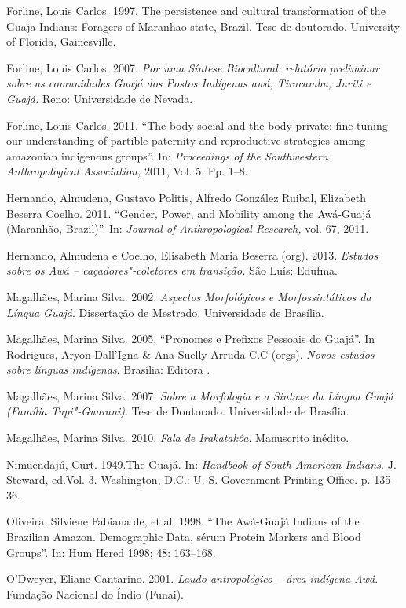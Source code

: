 Forline, Louis Carlos. 1997. The persistence and cultural transformation
of the Guaja Indians: Foragers of Maranhao state, Brazil. Tese de
doutorado. University of Florida, Gainesville.

Forline, Louis Carlos. 2007. \emph{Por uma Síntese Biocultural:
relatório preliminar sobre as comunidades Guajá dos Postos Indígenas
awá, Tiracambu, Juriti e Guajá.} Reno: Universidade de Nevada.

Forline, Louis Carlos. 2011. ``The body social and the body private: fine
tuning our understanding of partible paternity and reproductive
strategies among amazonian indigenous groups''. In: \emph{Proceedings of
the Southwestern Anthropological Association,} 2011, Vol. 5, Pp. 1--8.

Hernando, Almudena, Gustavo Politis, Alfredo González Ruibal, Elizabeth
Beserra Coelho. 2011. ``Gender, Power, and Mobility among the Awá-Guajá
(Maranhão, Brazil)''. In: \emph{Journal of Anthropological Research,}
vol. 67, 2011.

Hernando, Almudena e Coelho, Elisabeth Maria Beserra (org). 2013.
\emph{Estudos sobre os Awá -- caçadores"-coletores em transição.} São
Luís: Edufma.

Magalhães, Marina Silva. 2002. \emph{Aspectos Morfológicos e
Morfossintáticos da Língua Guajá}. Dissertação de Mestrado. Universidade
de Brasília.

Magalhães, Marina Silva. 2005. ``Pronomes e Prefixos Pessoais do
Guajá''. In Rodrigues, Aryon Dall'Igna \& Ana Suelly Arruda C.C (orgs).
\emph{Novos estudos sobre línguas indígenas}. Brasília: Editora .

Magalhães, Marina Silva. 2007. \emph{Sobre a Morfologia e a Sintaxe da
Língua Guajá (Família Tupi"-Guarani)}. Tese de Doutorado. Universidade de
Brasília.

Magalhães, Marina Silva. 2010. \emph{Fala de Irakatakôa}. Manuscrito
inédito.

Nimuendajú, Curt. 1949.The Guajá. In: \emph{Handbook of South American
Indians.} J. Steward, ed.Vol. 3. Washington, D.C.: U. S. Government
Printing Office. p. 135--36.

Oliveira, Silviene Fabiana de, et al. 1998. ``The Awá-Guajá Indians of
the Brazilian Amazon. Demographic Data, sérum Protein Markers and Blood
Groups''. In: Hum Hered 1998; 48: 163--168.

O'Dweyer, Eliane Cantarino. 2001. \emph{Laudo antropológico -- área
indígena Awá}. Fundação Nacional do Índio (Funai).

